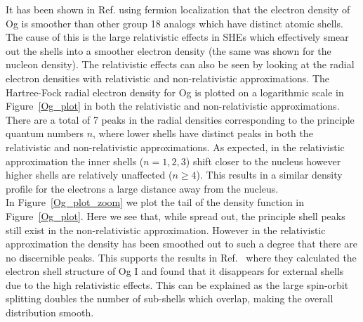 \documentclass[10pt,a4paper, twoside, openright]{report}
\begin{document}
It has been shown in Ref. \cite{Jerabek2018} using fermion localization that the electron density of Og is smoother than other group 18 analogs which have distinct atomic shells. The cause of this is the large relativistic effects in SHEs which effectively smear out the shells into a smoother electron density (the same was shown for the nucleon density). The relativistic effects can also be seen by looking at the radial electron densities with relativistic and non-relativistic approximations. The Hartree-Fock radial electron density for Og is plotted on a logarithmic scale in Figure~\ref{Og_plot} in both the relativistic and non-relativistic approximations. There are a total of 7 peaks in the radial densities corresponding to the principle quantum numbers $n$, where lower shells have distinct peaks in both the relativistic and non-relativistic approximations. As expected, in the relativistic approximation the inner shells ($n=1,2,3$) shift closer to the nucleus however higher shells are relatively unaffected ($n \geq 4$). This results in a similar density profile for the electrons a large distance away from the nucleus. \\
\linebreak
In Figure~\ref{Og_plot_zoom} we plot the tail of the density function in Figure~\ref{Og_plot}. Here we see that, while spread out, the principle shell peaks still exist in the non-relativistic approximation. However in the relativistic approximation the density has been smoothed out to such a degree that there are no discernible peaks. This supports the results in Ref.~\cite{Jerabek2018} where they calculated the electron shell structure of Og I and found that it disappears for external shells due to the high relativistic effects. This can be explained as the large spin-orbit splitting doubles the number of sub-shells which overlap, making the overall distribution smooth.\\
\end{document}
